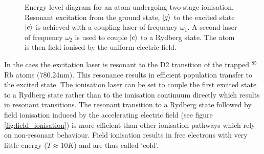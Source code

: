 \begin{figure}[h]

\hspace{0.235\textwidth}
\caption[Title]{Energy level diagram for an atom undergoing two-stage ionisation. Resonant excitation from the ground state, $\ket{g}$ to the excited state $\ket{e}$ is achieved with a coupling laser of frequency $\omega_1$. A second laser of frequency $\omega_2$ is used to couple $\ket{e}$ to a Rydberg state. The atom is then field ionised by the uniform electric field.}
\label{fig:energy_level}
\end{figure}

In the \gls{caes} the excitation laser is resonant to the D2 transition of the trapped $^{85}$Rb atoms (780.24nm). This resonance results in efficient population transfer to the excited state. The ionisation laser can be set to couple the first excited state to a Rydberg state rather than to the ionisation continuum directly which results in resonant transitions. The resonant transition to a Rydberg state followed by field ionisation induced by the accelerating electric field (see figure \ref{fig:field_ionisation}) is more efficient than other ionisation pathways which rely on non-resonant behaviour. Field ionisation results in free electrons with very little energy ($T\approx10K$\cite{mcculloch_arbitrarily_2011}) and are thus called `cold'.

